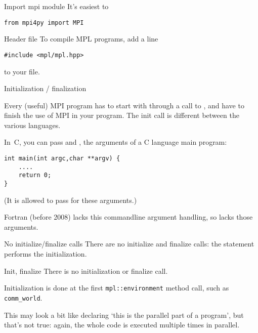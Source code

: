 \begin{pythonnote}{Import mpi module}
  It's easiest to
\begin{lstlisting}
from mpi4py import MPI
\end{lstlisting}
\end{pythonnote}

\begin{mplnote}{Header file}
  To compile MPL programs, add a line
\begin{lstlisting}
#include <mpl/mpl.hpp>
\end{lstlisting}
  to your file.
\end{mplnote}

 {Initialization / finalization}
\label{sec:mpi-init}

Every (useful) MPI program has to start with 
through a call to
, and have
 to finish the use of MPI in your program.
The init call is different between the various languages.

In~C, you can pass  and , the arguments
of a C language main program:
 \begin{lstlisting}
int main(int argc,char **argv) {
    ....
    return 0;
}
\end{lstlisting}
(It is allowed to pass  for these arguments.)

Fortran (before 2008) lacks this commandline argument handling,
so  lacks those arguments.

\begin{pythonnote}{No initialize/finalize calls}
  There are no initialize and finalize calls: the  statement
  performs the initialization.
\end{pythonnote}

\begin{mplnote}{Init, finalize}
  There is no initialization or finalize call.
  \begin{mplimpl}
    Initialization is done at the first \lstinline+mpl::environment+ method call,
    such as \lstinline+comm_world+.
  \end{mplimpl}

\end{mplnote}

This may look a bit like declaring `this is the parallel part of a
program', but that's not true: again, the whole code is executed
multiple times in parallel.

